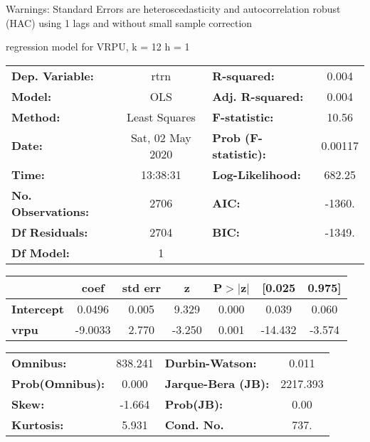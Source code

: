 Warnings: \newline
 [1] Standard Errors are heteroscedasticity and autocorrelation robust (HAC) using 1 lags and without small sample correction\ 

regression model for VRPU, k = 12 h = 1\begin{center}
\begin{tabular}{lclc}
\toprule
\textbf{Dep. Variable:}    &       rtrn       & \textbf{  R-squared:         } &     0.004   \\
\textbf{Model:}            &       OLS        & \textbf{  Adj. R-squared:    } &     0.004   \\
\textbf{Method:}           &  Least Squares   & \textbf{  F-statistic:       } &     10.56   \\
\textbf{Date:}             & Sat, 02 May 2020 & \textbf{  Prob (F-statistic):} &  0.00117    \\
\textbf{Time:}             &     13:38:31     & \textbf{  Log-Likelihood:    } &    682.25   \\
\textbf{No. Observations:} &        2706      & \textbf{  AIC:               } &    -1360.   \\
\textbf{Df Residuals:}     &        2704      & \textbf{  BIC:               } &    -1349.   \\
\textbf{Df Model:}         &           1      & \textbf{                     } &             \\
\bottomrule
\end{tabular}
\begin{tabular}{lcccccc}
                   & \textbf{coef} & \textbf{std err} & \textbf{z} & \textbf{P$> |$z$|$} & \textbf{[0.025} & \textbf{0.975]}  \\
\midrule
\textbf{Intercept} &       0.0496  &        0.005     &     9.329  &         0.000        &        0.039    &        0.060     \\
\textbf{vrpu}      &      -9.0033  &        2.770     &    -3.250  &         0.001        &      -14.432    &       -3.574     \\
\bottomrule
\end{tabular}
\begin{tabular}{lclc}
\textbf{Omnibus:}       & 838.241 & \textbf{  Durbin-Watson:     } &    0.011  \\
\textbf{Prob(Omnibus):} &   0.000 & \textbf{  Jarque-Bera (JB):  } & 2217.393  \\
\textbf{Skew:}          &  -1.664 & \textbf{  Prob(JB):          } &     0.00  \\
\textbf{Kurtosis:}      &   5.931 & \textbf{  Cond. No.          } &     737.  \\
\bottomrule
\end{tabular}
\end{center}

